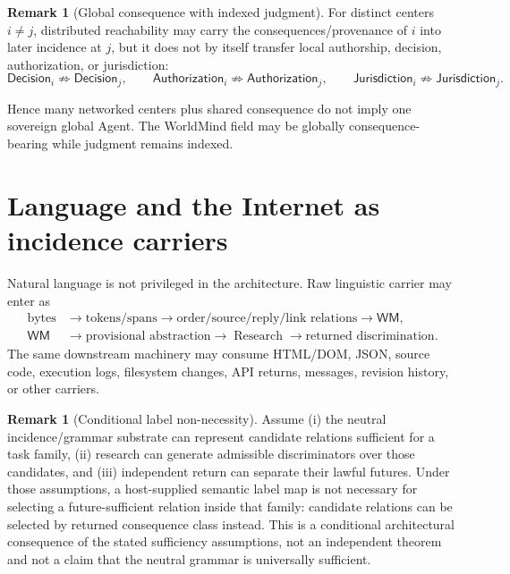 \documentclass[10pt]{article}
\theoremstyle{venus}
\theoremstyle{definition}
\newtheorem{remark}[theorem]{Remark}
\newcommand{\Research}{\operatorname{Research}}
\newcommand{\WM}{\mathsf{WM}}
\begin{document}
\begin{remark}[Global consequence with indexed judgment]
For distinct centers $i\neq j$, distributed reachability may carry the
consequences/provenance of $i$ into later incidence at $j$, but it does not by
itself transfer local authorship, decision, authorization, or jurisdiction:
\begin{equation}\label{eq:noninherit}
\mathsf{Decision}_i\not\Rightarrow\mathsf{Decision}_j,
\qquad
\mathsf{Authorization}_i\not\Rightarrow\mathsf{Authorization}_j,
\qquad
\mathsf{Jurisdiction}_i\not\Rightarrow\mathsf{Jurisdiction}_j.
\end{equation}
\end{remark}

Hence many networked centers plus shared consequence do not imply one sovereign
global Agent. The WorldMind field may be globally consequence-bearing while
judgment remains indexed.

\section{Language and the Internet as incidence carriers}

Natural language is not privileged in the architecture. Raw linguistic carrier
may enter as
\[
\begin{aligned}
\text{bytes}&\to\text{tokens/spans}
\to\text{order/source/reply/link relations}
\to\WM,\\
\WM&\to\text{provisional abstraction}
\to\Research
\to\text{returned discrimination}.
\end{aligned}
\]
The same downstream machinery may consume HTML/DOM, JSON, source code,
execution logs, filesystem changes, API returns, messages, revision history, or
other carriers.

\begin{remark}[Conditional label non-necessity]
Assume (i) the neutral incidence/grammar substrate can represent candidate
relations sufficient for a task family, (ii) research can generate admissible
discriminators over those candidates, and (iii) independent return can
separate their lawful futures. Under those assumptions, a host-supplied
semantic label map is not necessary for selecting a future-sufficient relation
inside that family: candidate relations can be selected by returned
consequence class instead. This is a conditional architectural consequence of
the stated sufficiency assumptions, not an independent theorem and not a claim
that the neutral grammar is universally sufficient.
\end{remark}
\end{document}
